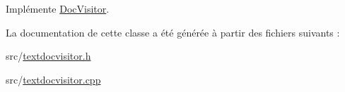 Implémente \hyperlink{class_doc_visitor_a3545acbb5cf745cb1cb49aa237b53ead}{Doc\+Visitor}.



La documentation de cette classe a été générée à partir des fichiers suivants \+:\begin{DoxyCompactItemize}
\item 
src/\hyperlink{textdocvisitor_8h}{textdocvisitor.\+h}\item 
src/\hyperlink{textdocvisitor_8cpp}{textdocvisitor.\+cpp}\end{DoxyCompactItemize}
